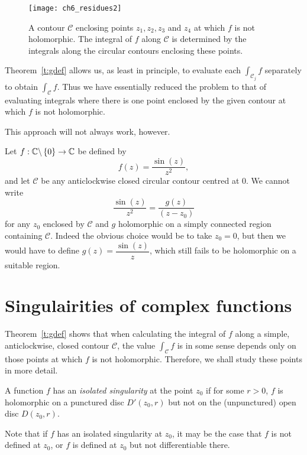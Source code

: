 \begin{figure}[H]
\centering
\texttt{[image: ch6\_residues2]}
\caption{A contour $\mathcal{C}$ enclosing points $z_1,z_2,z_3$ and $z_4$ at which $f$ is not holomorphic.  The integral of $f$ along $\mathcal{C}$ is determined by the integrals along the circular contours enclosing these points.}
\end{figure}

 Theorem~\ref{t:gdef} allows us, as least in principle, to evaluate each $\int_{\mathcal{C}_j} f$ separately to obtain $\int_{\mathcal{C}} f$.  Thus we have essentially reduced the problem to that of evaluating integrals where there is one point enclosed by the given contour at which $f$ is not holomorphic.  
 
 This approach will not always work, however. 
  
\begin{example}
Let $f: \mathbb{C} \backslash \left\{0\right\} \to \mathbb{C}$ be defined by
\[
f(z) = \frac{\sin(z)}{z^2},
\]
and let $\mathcal{C}$ be any anticlockwise closed circular contour centred at $0$.
We cannot write
\[
\frac{\sin (z)}{z^2} = \frac{g(z)}{(z-z_0)}
\]
for any $z_0$ enclosed by $\mathcal{C}$ and $g$ holomorphic on a simply connected region containing $\mathcal{C}$.  Indeed the obvious choice would be to take $z_0=0$, but then we would have to define $g(z) = \dfrac{\sin(z)}{z}$, which still fails to be holomorphic on a suitable region.
\end{example}



\section{Singulairities of complex functions}
Theorem~\ref{t:gdef} shows that when calculating the integral of $f$ along a simple, anticlockwise, closed contour $\mathcal{C}$, the value $\int_{\mathcal{C}} f$ is in some sense depends only on those points at which $f$ is not holomorphic.  Therefore, we shall study these points in more detail.

\begin{definition}
A function $f$ has an \emph{isolated singularity} at the point $z_0$ if for some $r>0$, $f$ is holomorphic on a punctured disc $D'(z_0,r)$ but not on the (unpunctured) open disc $D(z_0,r)$.
\end{definition}
Note that if $f$ has an isolated singularity at $z_0$, it may be the case that $f$ is not defined at $z_0$, or $f$ is defined at $z_0$ but not differentiable there.

